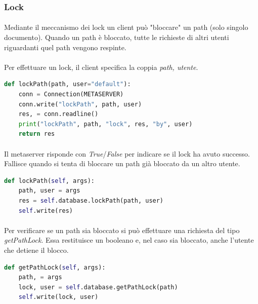 \documentclass[11pt,a4paper,english]{article}
\begin{document}
\subsubsection{Lock}

\paragraph{} Mediante il meccanismo dei lock un client può "bloccare" un path (solo singolo documento). Quando un path è bloccato, tutte le richieste di altri utenti riguardanti quel path vengono respinte. 

\paragraph{} Per effettuare un lock, il client specifica la coppia \emph{path, utente}. 

\begin{lstlisting}[language=Python, title=Client]
def lockPath(path, user="default"):
    conn = Connection(METASERVER)
    conn.write("lockPath", path, user)
    res, = conn.readline()
    print("lockPath", path, "lock", res, "by", user)
    return res
\end{lstlisting}

\paragraph{} Il metaserver risponde con \emph{True}/\emph{False} per indicare se il lock ha avuto successo. Fallisce quando si tenta di bloccare un path già bloccato da un altro utente.

\begin{lstlisting}[language=Python, title=Metaserver]
def lockPath(self, args):
    path, user = args
    res = self.database.lockPath(path, user)
    self.write(res)
\end{lstlisting}

\paragraph{} Per verificare se un path sia bloccato si può effettuare una richiesta del tipo \emph{getPathLock}. Essa restituisce un booleano e, nel caso sia bloccato, anche l'utente che detiene il blocco.

\begin{lstlisting}[language=Python, title=Metaserver]
def getPathLock(self, args):
    path, = args
    lock, user = self.database.getPathLock(path)
    self.write(lock, user)
\end{lstlisting}
\end{document}
